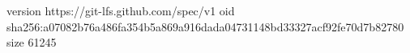 version https://git-lfs.github.com/spec/v1
oid sha256:a07082b76a486fa354b5a869a916dada04731148bd33327acf92fe70d7b82780
size 61245
